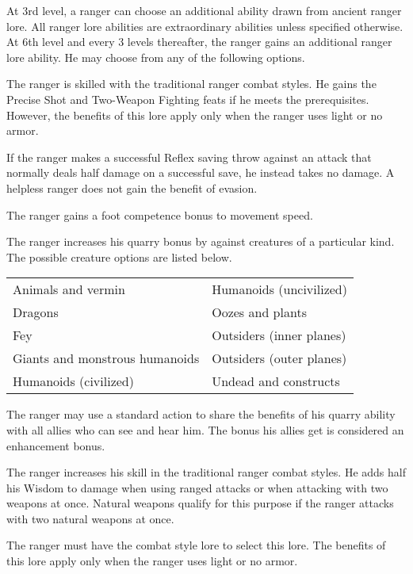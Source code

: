  At 3rd level, a ranger can choose an additional ability drawn from ancient ranger lore. All ranger lore abilities are extraordinary abilities unless specified otherwise. At 6th level and every 3 levels thereafter, the ranger gains an additional ranger lore ability. He may choose from any of the following options.

 The ranger is skilled with the traditional ranger combat styles. He gains the Precise Shot and Two-Weapon Fighting feats if he meets the prerequisites. However, the benefits of this lore apply only when the ranger uses light or no armor.

 If the ranger makes a successful Reflex saving throw against an attack that normally deals half damage on a successful save, he instead takes no damage. A helpless ranger does not gain the benefit of evasion.

 The ranger gains a  foot competence bonus to movement speed.

 The ranger increases his quarry bonus by  against creatures of a particular kind. The possible creature options are listed below.

\begin{dtable}
\begin{tabularx}{\columnwidth}{X X}
Animals and vermin & Humanoids (uncivilized) \\
Dragons & Oozes and plants \\
Fey & Outsiders (inner planes) \\
Giants and monstrous humanoids & Outsiders (outer planes) \\
Humanoids (civilized)  & Undead and constructs \\
\end{tabularx}
\end{dtable}

 The ranger may use a standard action to share the benefits of his quarry ability with all allies who can see and hear him. The bonus his allies get is considered an enhancement bonus.

 The ranger increases his skill in the traditional ranger combat styles. He adds half his Wisdom to damage when using ranged attacks or when attacking with two weapons at once. Natural weapons qualify for this purpose if the ranger attacks with two natural weapons at once.

The ranger must have the combat style lore to select this lore. The benefits of this lore apply only when the ranger uses light or no armor.

